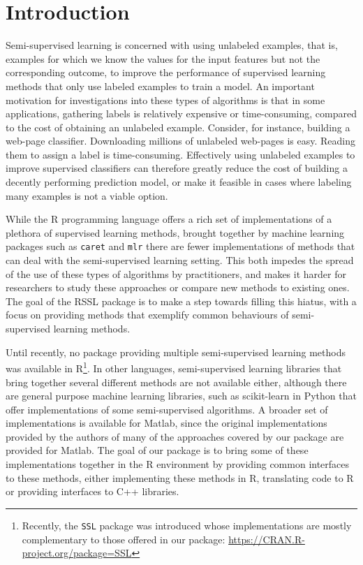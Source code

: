 \documentclass[twoside]{memoir}\usepackage[]{graphicx}\usepackage{xcolor}
\renewcommand{\cite}{\citep}
\begin{document}
\section{Introduction}
Semi-supervised learning is concerned with using unlabeled examples, that is, examples for which we know the values for the input features but not the corresponding outcome, to improve the performance of supervised learning methods that only use labeled examples to train a model. An important motivation for investigations into these types of algorithms is that in some applications, gathering labels is relatively expensive or time-consuming, compared to the cost of obtaining an unlabeled example. Consider, for instance, building a web-page classifier. Downloading millions of unlabeled web-pages is easy. Reading them to assign a label is time-consuming. Effectively using unlabeled examples to improve supervised classifiers can therefore greatly reduce the cost of building a decently performing prediction model, or make it feasible in cases where labeling many examples is not a viable option.

While the R programming language \cite{RCoreTeam2016} offers a rich set of implementations of a plethora of supervised learning methods, brought together by machine learning packages such as \texttt{caret} and \texttt{mlr} there are fewer implementations of methods that can deal with the semi-supervised learning setting. This both impedes the spread of the use of these types of algorithms by practitioners, and makes it harder for researchers to study these approaches or compare new methods to existing ones.  The goal of the RSSL package is to make a step towards filling this hiatus, with a focus on providing methods that exemplify common behaviours of semi-supervised learning methods.

Until recently, no package providing multiple semi-supervised learning methods was available in R\footnote{Recently, the \texttt{SSL} package was introduced whose implementations are mostly complementary to those offered in our package: \url{https://CRAN.R-project.org/package=SSL}}. In other languages, semi-supervised learning libraries that bring together several different methods are not available either, although there are general purpose machine learning libraries, such as scikit-learn in Python \cite{scikit-learn} that offer implementations of some semi-supervised algorithms. A broader set of implementations is available for Matlab, since the original implementations provided by the authors of many of the approaches covered by our package are provided for Matlab. The goal of our package is to bring some of these implementations together in the R environment by providing common interfaces to these methods, either implementing these methods in R, translating code to R or providing interfaces to C++ libraries.
\end{document}
